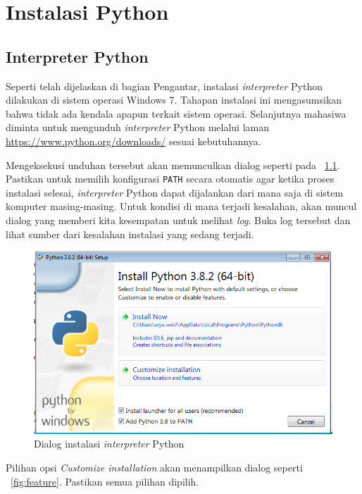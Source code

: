 \chapter{Instalasi Python}

\section{Interpreter Python}
\label{sec:interpreter}
Seperti telah dijelaskan di bagian Pengantar, instalasi \textit{interpreter} Python dilakukan di sistem operasi Windows 7. Tahapan instalasi ini mengasumsikan bahwa tidak ada kendala apapun terkait sistem operasi. Selanjutnya mahasiwa diminta untuk mengunduh \textit{interpreter} Python melalui laman \url{https://www.python.org/downloads/} sesuai kebutuhannya. 

Mengeksekusi unduhan tersebut akan memunculkan dialog seperti pada \figurename~\ref{fig:install1}. Pastikan untuk memilih konfigurasi \texttt{PATH} secara otomatis agar ketika proses instalasi selesai, \textit{interpreter} Python dapat dijalankan dari mana saja di sistem komputer masing-masing. Untuk kondisi di mana terjadi kesalahan, akan muncul dialog yang memberi kita kesempatan untuk melihat \textit{log}. Buka log tersebut dan lihat sumber dari kesalahan instalasi yang sedang terjadi.

\begin{figure}[h!]
   \begin{center}
     \includegraphics[scale=.5]{pics/installPython1.png}
     \caption{Dialog instalasi \textit{interpreter} Python}
     \label{fig:install1}
   \end{center}
 \end{figure} 

Pilihan opsi \textit{Customize installation} akan menampilkan dialog seperti \figurename~\ref{fig:feature}. Pastikan semua pilihan dipilih.

